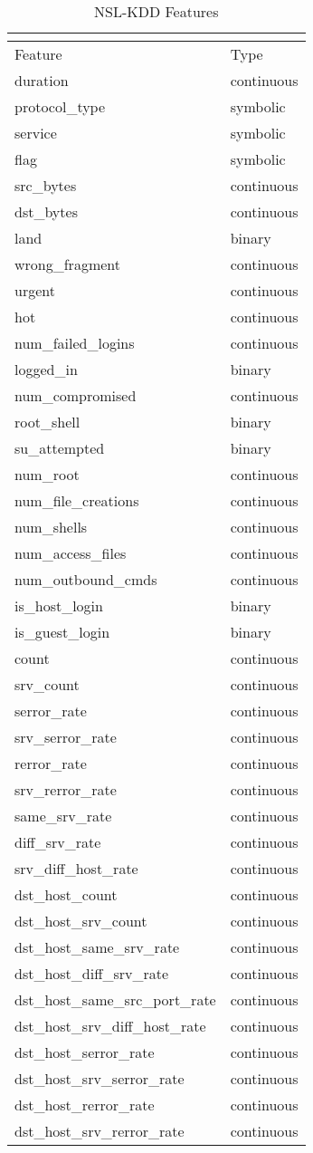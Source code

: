 \begin{longtable}{@{}ll@{}}
\caption{NSL-KDD Features} \\
\label{nf} \\
\toprule
Feature & Type \\ \midrule
duration & continuous \\
protocol\_type & symbolic \\
service & symbolic \\
flag & symbolic \\
src\_bytes & continuous \\
dst\_bytes & continuous \\
land & binary \\
wrong\_fragment & continuous \\
urgent & continuous \\
hot & continuous \\
num\_failed\_logins & continuous \\
logged\_in & binary \\
num\_compromised & continuous \\
root\_shell & binary \\
su\_attempted & binary \\
num\_root & continuous \\
num\_file\_creations & continuous \\
num\_shells & continuous \\
num\_access\_files & continuous \\
num\_outbound\_cmds & continuous \\
is\_host\_login & binary \\
is\_guest\_login & binary \\
count & continuous \\
srv\_count & continuous \\
serror\_rate & continuous \\
srv\_serror\_rate & continuous \\
rerror\_rate & continuous \\
srv\_rerror\_rate & continuous \\
same\_srv\_rate & continuous \\
diff\_srv\_rate & continuous \\
srv\_diff\_host\_rate & continuous \\
dst\_host\_count & continuous \\
dst\_host\_srv\_count & continuous \\
dst\_host\_same\_srv\_rate & continuous \\
dst\_host\_diff\_srv\_rate & continuous \\
dst\_host\_same\_src\_port\_rate & continuous \\
dst\_host\_srv\_diff\_host\_rate & continuous \\
dst\_host\_serror\_rate & continuous \\
dst\_host\_srv\_serror\_rate & continuous \\
dst\_host\_rerror\_rate & continuous \\
dst\_host\_srv\_rerror\_rate & continuous \\
\bottomrule
\end{longtable}
